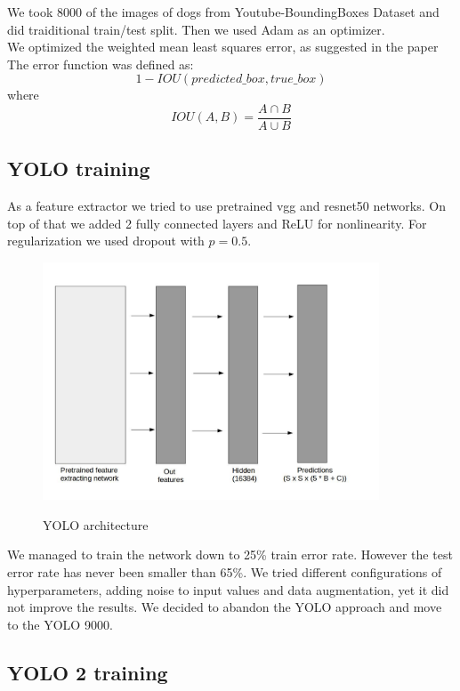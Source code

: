 \documentclass{article}
\begin{document}
We took 8000 of the images of dogs from Youtube-BoundingBoxes Dataset and did traiditional train/test split. Then we used Adam as an optimizer. \\

We optimized the weighted mean least squares error, as suggested in the paper \cite{yolo} \\

The error function was defined as:
$$ 1 - IOU(predicted\_box, true\_box)$$
where
$$ IOU(A, B) = \frac{ A \cap B}{A \cup B} $$

\subsection*{YOLO training}
As a feature extractor we tried to use pretrained vgg and resnet50 networks. On top of that we added 2 fully connected layers and ReLU for nonlinearity. For regularization we used dropout with $p = 0.5$. 

\begin{figure}[H]
	\begin{center}
		\includegraphics[width=10cm]{yolo_arch.jpg}\\
		\centering
		\caption{YOLO architecture}
	\end{center}
\hfill

\end{figure}

We managed to train the network down to 25\% train error rate. However the test error rate has never been smaller than 65\%. We tried different configurations of hyperparameters, adding noise to input values and data augmentation, yet it did not improve the results. We decided to abandon the YOLO approach and move to the YOLO 9000.

\subsection*{YOLO 2 training}
\end{document}
